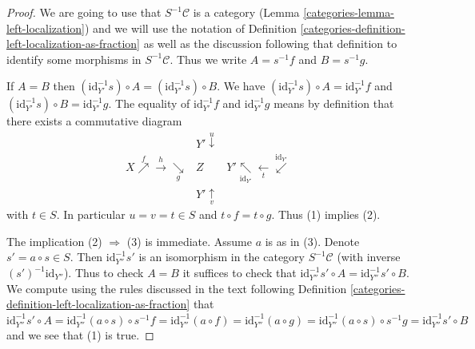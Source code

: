 \begin{proof}

We are going to use that $S^{-1}\mathcal{C}$ is a category
(Lemma \ref{categories-lemma-left-localization}) and we will
use the notation of Definition \ref{categories-definition-left-localization-as-fraction}
as well as the discussion following that definition to identify some
morphisms in $S^{-1}\mathcal{C}$. Thus we write $A = s^{-1}f$ and $B = s^{-1}g$.

\medskip\noindent
If $A = B$ then
$(\text{id}_{Y'}^{-1}s) \circ A = (\text{id}_{Y'}^{-1}s) \circ B$.
We have $(\text{id}_{Y'}^{-1}s) \circ A = \text{id}_{Y'}^{-1}f$
and $(\text{id}_{Y'}^{-1}s) \circ B = \text{id}_{Y'}^{-1}g$.
The equality of $\text{id}_{Y'}^{-1}f$ and $\text{id}_{Y'}^{-1}g$
means by definition that there exists a commutative diagram
$$
\begin{array}{ccc} & Y' \overset{u}{\downarrow} &  \\ X \overset{f}{\nearrow}\overset{h}{\longrightarrow}\underset{g}{\searrow} & Z & Y' \underset{\text{id}_{Y'}}{\nwarrow}\underset{t}{\longleftarrow}\overset{\text{id}_{Y'}}{\swarrow} \\  & Y' \underset{v}{\uparrow} & \end{array}
$$
with $t \in S$. In particular $u = v = t \in S$ and $t \circ f = t\circ g$.
Thus (1) implies (2).

\medskip\noindent
The implication (2) $\Rightarrow$ (3) is immediate. Assume $a$ is as in (3).
Denote $s' = a \circ s \in S$.
Then $\text{id}_{Y''}^{-1}s'$ is an isomorphism in the category
$S^{-1}\mathcal{C}$ (with inverse $(s')^{-1}\text{id}_{Y''}$).
Thus to check $A = B$ it suffices to check that
$\text{id}_{Y''}^{-1}s' \circ A = \text{id}_{Y''}^{-1}s' \circ B$.
We compute using the rules discussed in the text following
Definition \ref{categories-definition-left-localization-as-fraction} that
$\text{id}_{Y''}^{-1}s' \circ A =
\text{id}_{Y''}^{-1}(a \circ s) \circ s^{-1}f =
\text{id}_{Y''}^{-1}(a \circ f) =
\text{id}_{Y''}^{-1}(a \circ g) =
\text{id}_{Y''}^{-1}(a \circ s) \circ s^{-1}g =
\text{id}_{Y''}^{-1}s' \circ B$ and we see that (1) is true.
\end{proof}

